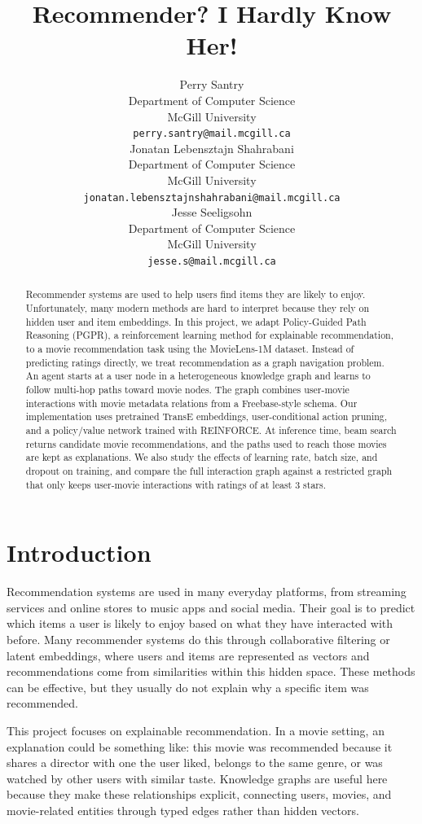 \documentclass{article}
\title{Recommender? I Hardly Know Her!}
\author{%
  Perry Santry \\
  Department of Computer Science\\
  McGill University\\
  \texttt{perry.santry@mail.mcgill.ca} \\
  \And
  Jonatan Lebensztajn Shahrabani \\
  Department of Computer Science\\
  McGill University\\
  \texttt{jonatan.lebensztajnshahrabani@mail.mcgill.ca} \\
  \And
  Jesse Seeligsohn \\
  Department of Computer Science\\
  McGill University\\
  \texttt{jesse.s@mail.mcgill.ca} \\
}
\begin{document}
\maketitle

\begin{abstract}
Recommender systems are used to help users find items they are likely to enjoy. Unfortunately, many modern methods are hard to interpret because they rely on hidden user and item embeddings. In this project, we adapt Policy-Guided Path Reasoning (PGPR), a reinforcement learning method for explainable recommendation, to a movie recommendation task using the MovieLens-1M dataset. Instead of predicting ratings directly, we treat recommendation as a graph navigation problem. An agent starts at a user node in a heterogeneous knowledge graph and learns to follow multi-hop paths toward movie nodes. The graph combines user-movie interactions with movie metadata relations from a Freebase-style schema. Our implementation uses pretrained TransE embeddings, user-conditional action pruning, and a policy/value network trained with REINFORCE. At inference time, beam search returns candidate movie recommendations, and the paths used to reach those movies are kept as explanations. We also study the effects of learning rate, batch size, and dropout on training, and compare the full interaction graph against a restricted graph that only keeps user-movie interactions with ratings of at least 3 stars.
\end{abstract}

\section{Introduction}

Recommendation systems are used in many everyday platforms, from streaming services and online stores to music apps and social media. Their goal is to predict which items a user is likely to enjoy based on what they have interacted with before. Many recommender systems do this through collaborative filtering or latent embeddings, where users and items are represented as vectors and recommendations come from similarities within this hidden space. These methods can be effective, but they usually do not explain why a specific item was recommended.

This project focuses on explainable recommendation. In a movie setting, an explanation could be something like: this movie was recommended because it shares a director with one the user liked, belongs to the same genre, or was watched by other users with similar taste. Knowledge graphs are useful here because they make these relationships explicit, connecting users, movies, and movie-related entities through typed edges rather than hidden vectors.
\end{document}
